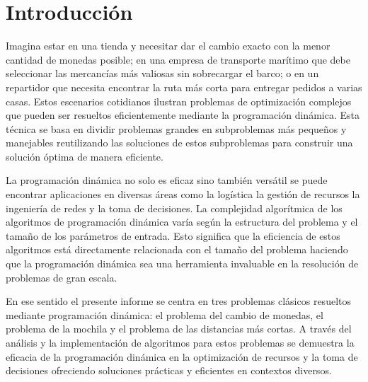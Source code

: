 \section{Introducción}
Imagina estar en una tienda y necesitar dar el cambio exacto con la menor cantidad de monedas posible; en una empresa de transporte marítimo que debe seleccionar las mercancías más valiosas sin sobrecargar el barco; o en un repartidor que necesita encontrar la ruta más corta para entregar pedidos a varias casas. Estos escenarios cotidianos ilustran problemas de optimización complejos que pueden ser resueltos eficientemente mediante la programación dinámica. Esta técnica se basa en dividir problemas grandes en subproblemas más pequeños y manejables reutilizando las soluciones de estos subproblemas para construir una solución óptima de manera eficiente.

La programación dinámica no solo es eficaz sino también versátil se puede encontrar aplicaciones en diversas áreas como la logística la gestión de recursos la ingeniería de redes y la toma de decisiones. La complejidad algorítmica de los algoritmos de programación dinámica varía según la estructura del problema y el tamaño de los parámetros de entrada. Esto significa que la eficiencia de estos algoritmos está directamente relacionada con el tamaño del problema haciendo que la programación dinámica sea una herramienta invaluable en la resolución de problemas de gran escala.

En ese sentido el presente informe se centra en tres problemas clásicos resueltos mediante programación dinámica: el problema del cambio de monedas, el problema de la mochila y el problema de las distancias más cortas. A través del análisis y la implementación de algoritmos para estos problemas se demuestra la eficacia de la programación dinámica en la optimización de recursos y la toma de decisiones ofreciendo soluciones prácticas y eficientes en contextos diversos.
